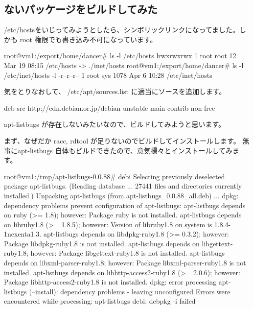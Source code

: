 \documentclass[mingoth,a4paper]{jsarticle}
\begin{document}
\subsection{ないパッケージをビルドしてみた}

/etc/hostsをいじってみようとしたら、シンボリックリンクになってました。し
かも root 権限でも書き込み不可になっています。

\begin{commandline}
root@vm1:/export/home/dancer# ls -l /etc/hosts
lrwxrwxrwx 1 root root 12 Mar 19 08:15 /etc/hosts -> ./inet/hosts
root@vm1:/export/home/dancer# ls -l /etc/inet/hosts -l 
-r--r--r-- 1 root sys 1078 Apr  6 10:28 /etc/inet/hosts
\end{commandline}

気をとりなおして、 /etc/apt/sources.list に適当にソースを追加します。

\begin{commandline}
deb-src http://cdn.debian.or.jp/debian unstable main contrib non-free
\end{commandline}

apt-listbugs が存在しないみたいなので、ビルドしてみようと思います。

まず、なぜだか racc, rdtool が足りないのでビルドしてインストールします。
無事にapt-listbugs 自体もビルドできたので、意気揚々とインストールしてみま
す。

\begin{commandline}
root@vm1:/tmp/apt-listbugs-0.0.88# debi
Selecting previously deselected package apt-listbugs.
(Reading database ... 27441 files and directories currently installed.)
Unpacking apt-listbugs (from apt-listbugs_0.0.88_all.deb) ...
dpkg: dependency problems prevent configuration of apt-listbugs:
 apt-listbugs depends on ruby (>= 1.8); however:
  Package ruby is not installed.
 apt-listbugs depends on libruby1.8 (>= 1.8.5); however:
  Version of libruby1.8 on system is 1.8.4-1nexenta1.3.
 apt-listbugs depends on libdpkg-ruby1.8 (>= 0.3.2); however:
  Package libdpkg-ruby1.8 is not installed.
 apt-listbugs depends on libgettext-ruby1.8; however:
  Package libgettext-ruby1.8 is not installed.
 apt-listbugs depends on libxml-parser-ruby1.8; however:
  Package libxml-parser-ruby1.8 is not installed.
 apt-listbugs depends on libhttp-access2-ruby1.8 (>= 2.0.6); however:
  Package libhttp-access2-ruby1.8 is not installed.
dpkg: error processing apt-listbugs (--install):
 dependency problems - leaving unconfigured
Errors were encountered while processing:
 apt-listbugs
debi: debpkg -i failed
\end{commandline}
\end{document}
